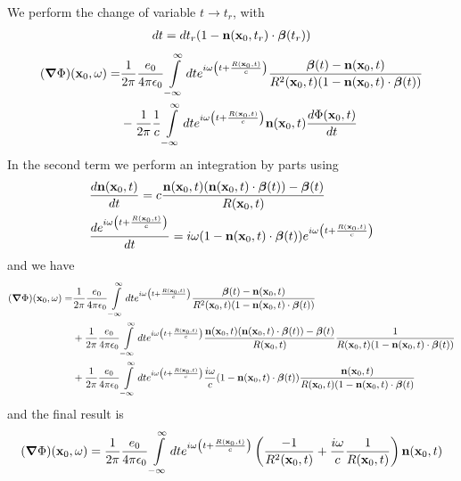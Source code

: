 We perform the change of variable $t\rightarrow t_r$, with
\begin{align}
    dt=dt_r(1-{\bf n}({\bf x}_0,t_r)\cdot{\boldsymbol{\beta}}(t_r))
\end{align}
\begin{align}
    ({\boldsymbol{\nabla}}\Phi)({\bf x}_0,\omega)= & \frac1{2\pi}\frac{e_0}{4\pi\epsilon_0}\int\limits_{-\infty}^{\infty}dte^{i\omega \left(t+\frac{R({\bf x}_0,t)}c\right)}\frac{{\boldsymbol{\beta}}(t)-{\bf n}({\bf x}_0,t)}{R^2({\bf x}_0,t)(1-{\bf n}({\bf x}_0,t)\cdot{\boldsymbol{\beta}}(t))}\nonumber \\
                                                   & -\frac1{2\pi}\frac1c\int\limits_{-\infty}^{\infty}dte^{i\omega  \left(t+\frac{R({\bf x}_0,t)}c\right)}{{\bf n}({\bf x}_0,t)}\frac{d\Phi({\bf x}_0,t)}{dt}
\end{align}
In the second term we perform an integration by parts using
\begin{align}
     & \frac{d{\bf n}({\bf x}_0,t)}{dt}=c\frac{{\bf n}({\bf x}_0,t)({\bf n}({\bf x}_0,t)\cdot{\boldsymbol{\beta}}(t))-{\boldsymbol{\beta}}(t)}{R({\bf x}_0,t)}                    \\
     & \frac{de^{i\omega \left(t+\frac{R({\bf x}_0,t)}c\right)}}{dt}=i\omega(1-{\bf n}({\bf x}_0,t)\cdot{\boldsymbol{\beta}}(t))e^{i\omega \left(t+\frac{R({\bf x}_0,t)}c\right)}
\end{align}
and we have
\begin{align}
    ({\boldsymbol{\nabla}}\Phi)({\bf x}_0,\omega)= & \frac1{2\pi}\frac{e_0}{4\pi\epsilon_0}\int\limits_{-\infty}^{\infty}dte^{i\omega \left(t+\frac{R({\bf x}_0,t)}c\right)}\frac{{\boldsymbol{\beta}}(t)-{\bf n}({\bf x}_0,t)}{R^2({\bf x}_0,t)(1-{\bf n}({\bf x}_0,t)\cdot{\boldsymbol{\beta}}(t))}\nonumber                                                                           \\
                                                   & +\frac1{2\pi}\frac{e_0}{4\pi\epsilon_0}\int\limits_{-\infty}^{\infty}dte^{i\omega  \left(t+\frac{R({\bf x}_0,t)}c\right)}\frac{{\bf n}({\bf x}_0,t)({\bf n}({\bf x}_0,t)\cdot{\boldsymbol{\beta}}(t))-{\boldsymbol{\beta}}(t)}{R({\bf x}_0,t)}\frac{1}{R({\bf x}_0,t)(1-{\bf n}({\bf x}_0,t)\cdot{\boldsymbol{\beta}}(t))}\nonumber \\
                                                   & +\frac1{2\pi}\frac{e_0}{4\pi\epsilon_0}\int\limits_{-\infty}^{\infty}dte^{i\omega  \left(t+\frac{R({\bf x}_0,t)}c\right)}\frac{i\omega}c(1-{\bf n}({\bf x}_0,t)\cdot{\boldsymbol{\beta}}(t))\frac{{\bf n}({\bf x}_0,t)}{R({\bf x}_0,t)(1-{\bf n}({\bf x}_0,t)\cdot{\boldsymbol{\beta}}(t)}
\end{align}
and the final result is
\begin{align}
    ({\boldsymbol{\nabla}}\Phi)({\bf x}_0,\omega)=\frac1{2\pi}\frac{e_0}{4\pi\epsilon_0}\int\limits_{-\infty}^{\infty}dte^{i\omega \left(t+\frac{R({\bf x}_0,t)}c\right)}\left(\frac{-1}{R^2({\bf x}_0,t)}+\frac{i\omega}{c}\frac1{R({\bf x}_0,t)}\right){\bf n}({\bf x}_0,t)\label{gradphixomega}
\end{align}

